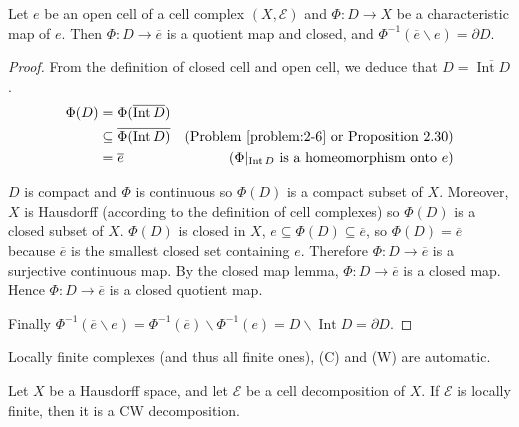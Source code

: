 \begin{note}\label{note:characteristic-map-as-a-quotient-map}
	Let \( e \) be an open cell of a cell complex \( (X, \mathscr{E}) \) and \( \Phi: D \to X \) be a characteristic map of \( e \). Then \( \Phi: D \to \overline{e} \) is a quotient map and closed, and \( \Phi^{-1}(\overline{e}\smallsetminus e) = \partial D \).
\end{note}

\begin{proof}
	From the definition of closed cell and open cell, we deduce that \( D = \overline{\operatorname{Int} D} \).
	\begin{align*}
		\Phi(D) & = \Phi(\overline{\operatorname{Int} D})                                                                                   \\
		        & \subseteq \overline{\Phi(\operatorname{Int} D)} & \text{(Problem~\ref{problem:2-6} or Proposition 2.30)}                  \\
		        & = \overline{e}                                  & \text{(\(  \Phi\vert_{\operatorname{Int} D}  \) is a homeomorphism onto \(  e  \))}
	\end{align*}

	\( D \) is compact and \( \Phi \) is continuous so \( \Phi(D) \) is a compact subset of \( X \). Moreover, \( X \) is Hausdorff (according to the definition of cell complexes) so \( \Phi(D) \) is a closed subset of \( X \). \( \Phi(D) \) is closed in \( X \), \( e\subseteq \Phi(D) \subseteq \overline{e} \), so \( \Phi(D) = \overline{e} \) because \( \overline{e} \) is the smallest closed set containing \( e \). Therefore \( \Phi: D \to \overline{e} \) is a surjective continuous map. By the closed map lemma, \( \Phi: D \to \overline{e} \) is a closed map. Hence \( \Phi: D \to \overline{e} \) is a closed quotient map.

	Finally \( \Phi^{-1}(\overline{e}\smallsetminus e) = \Phi^{-1}(\overline{e}) \smallsetminus \Phi^{-1}(e) = D \smallsetminus \operatorname{Int} D = \partial D \).
\end{proof}

Locally finite complexes (and thus all finite ones), (C) and (W) are automatic.

\begin{prop}{5.4}
	Let \( X \) be a Hausdorff space, and let \( \mathscr{E} \) be a cell decomposition of \( X \). If \( \mathscr{E} \) is locally finite, then it is a CW decomposition.
\end{prop}

